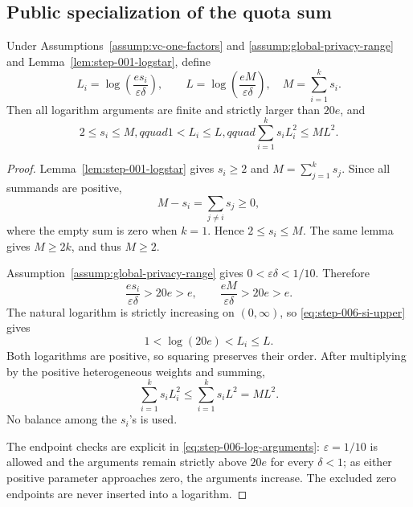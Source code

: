 \subsection{Public specialization of the quota sum}
\label{app:step-006}

\begin{lemma}
\label{lem:step-006-log-domination}
Under Assumptions~\ref{assump:vc-one-factors} and
\ref{assump:global-privacy-range} and
Lemma~\ref{lem:step-001-logstar}, define
\begin{equation}\label{eq:step-006-log-definitions}
L_i=\log\!\left(\frac{e s_i}{\varepsilon\delta}\right),
\qquad
L=\log\!\left(\frac{eM}{\varepsilon\delta}\right),
\quad M=\sum_{i=1}^ks_i.
\end{equation}
Then all logarithm arguments are finite and strictly larger than \(20e\),
and
\begin{equation}\label{eq:step-006-log-domination}
2\le s_i\le M,qquad
1<L_i\le L,qquad
\sum_{i=1}^ks_iL_i^2\le ML^2.
\end{equation}
\end{lemma}

\begin{proof}
Lemma~\ref{lem:step-001-logstar} gives \(s_i\ge2\) and
\(M=\sum_{j=1}^ks_j\).  Since all summands are positive,
\begin{equation}\label{eq:step-006-si-upper}
M-s_i=\sum_{j\ne i}s_j\ge0,
\end{equation}
where the empty sum is zero when \(k=1\).  Hence \(2\le s_i\le M\).
The same lemma gives \(M\ge2k\), and thus \(M\ge2\).

Assumption~\ref{assump:global-privacy-range} gives
\(0<\varepsilon\delta<1/10\).  Therefore
\begin{equation}\label{eq:step-006-log-arguments}
\frac{es_i}{\varepsilon\delta}>20e>e,
\qquad
\frac{eM}{\varepsilon\delta}>20e>e.
\end{equation}
The natural logarithm is strictly increasing on \((0,\infty)\), so
\eqref{eq:step-006-si-upper} gives
\begin{equation}\label{eq:step-006-log-order}
1<\log(20e)<L_i\le L.
\end{equation}
Both logarithms are positive, so squaring preserves their order.  After
multiplying by the positive heterogeneous weights and summing,
\begin{equation}\label{eq:step-006-heterogeneous-sum}
\sum_{i=1}^ks_iL_i^2
\le\sum_{i=1}^ks_iL^2=ML^2.
\end{equation}
No balance among the \(s_i\)'s is used.

The endpoint checks are explicit in
\eqref{eq:step-006-log-arguments}: \(\varepsilon=1/10\) is allowed and
the arguments remain strictly above \(20e\) for every \(\delta<1\); as
either positive parameter approaches zero, the arguments increase.  The
excluded zero endpoints are never inserted into a logarithm.
\end{proof}

